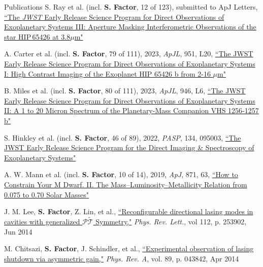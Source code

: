 \documentclass{resume} %
\begin{document}
\begin{rSection}{Publications}
    S. Ray et al. (incl. \textbf{S. Factor}, 12 of 123), submitted to ApJ Letters, \href{https://ui.adsabs.harvard.edu/abs/2023arXiv231011508R}{``The \textit{JWST} Early Release Science Program for Direct Observations of Exoplanetary Systems III: Aperture Masking Interferometric Observations of the star HIP\,65426 at 3.8$\mu$m"}
    
    A. Carter et al. (incl. \textbf{S. Factor}, 79 of 111), 2023, {\it ApJL}, 951, L20, \href{https://ui.adsabs.harvard.edu/abs/2023ApJ...951L..20C}{``The JWST Early Release Science Program for Direct Observations of Exoplanetary Systems I: High Contrast Imaging of the Exoplanet HIP 65426 b from 2-16 $\mu$m"}
    
    B. Miles et al. (incl. \textbf{S. Factor}, 80 of 111), 2023, {\it ApJL}, 946, L6, \href{https://ui.adsabs.harvard.edu/abs/2023ApJ...946L...6M}{``The JWST Early Release Science Program for Direct Observations of Exoplanetary Systems II: A 1 to 20 Micron Spectrum of the Planetary-Mass Companion VHS 1256-1257 b"}
    
    S. Hinkley et al. (incl. \textbf{S. Factor}, 46 of 89), 2022, {\it PASP}, 134, 095003, \href{https://ui.adsabs.harvard.edu/abs/2022PASP..134i5003H}{``The JWST Early Release Science Program for the Direct Imaging \& Spectroscopy of Exoplanetary Systems"}

    A. W. Mann et al. (incl. \textbf{S. Factor}, 10 of 14), 2019, {\it ApJ}, 871, 63, \href{https://ui.adsabs.harvard.edu/abs/2019ApJ...871...63M}{``How to Constrain Your M Dwarf. II. The Mass--Luminosity--Metallicity Relation from 0.075 to 0.70 Solar Masses"}

    J. M. Lee, \textbf{S. Factor}, Z. Lin, et al., \href{https://ui.adsabs.harvard.edu/abs/2014PhRvL.112y3902L}{``Reconfigurable directional lasing  modes in cavities with generalized $\mathcal{P}\tilde{\mathcal{T}}$ Symmetry,"} \emph{Phys. Rev. Lett.}, vol 112, p. 253902, Jun 2014

    M. Chitsazi, \textbf{S.  Factor}, J. Schindler, et al., \href{https://ui.adsabs.harvard.edu/abs/2014PhRvA..89d3842C}{``Experimental observation of lasing shutdown via asymmetric gain,"} \emph{Phys. Rev. A}, vol. 89, p. 043842, Apr 2014


\end{rSection}
\end{document}
